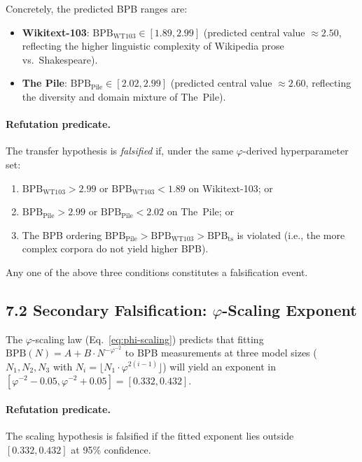 Concretely, the predicted BPB ranges are:
\begin{itemize}
  \item \textbf{Wikitext-103}:
    $\mathrm{BPB}_{\mathrm{WT103}} \in [1.89, 2.99]$
    (predicted central value $\approx 2.50$, reflecting the higher
    linguistic complexity of Wikipedia prose vs.\ Shakespeare).
  \item \textbf{The Pile}:
    $\mathrm{BPB}_{\mathrm{Pile}} \in [2.02, 2.99]$
    (predicted central value $\approx 2.60$, reflecting the
    diversity and domain mixture of The~Pile).
\end{itemize}

\paragraph{Refutation predicate.}
The transfer hypothesis is \emph{falsified} if, under the same
$\varphi$-derived hyperparameter set:
\begin{enumerate}
  \item $\mathrm{BPB}_{\mathrm{WT103}} > 2.99$ or
        $\mathrm{BPB}_{\mathrm{WT103}} < 1.89$ on Wikitext-103; or
  \item $\mathrm{BPB}_{\mathrm{Pile}} > 2.99$ or
        $\mathrm{BPB}_{\mathrm{Pile}} < 2.02$ on The~Pile; or
  \item The BPB ordering $\mathrm{BPB}_{\mathrm{Pile}} >
        \mathrm{BPB}_{\mathrm{WT103}} > \mathrm{BPB}_{\mathrm{ts}}$
        is violated (i.e., the more complex corpora do not yield higher BPB).
\end{enumerate}
Any one of the above three conditions constitutes a falsification
event.

\subsection{7.2 Secondary Falsification: $\varphi$-Scaling Exponent}
\label{subsec:ch25-falsify-scaling}

The $\varphi$-scaling law (Eq.~\ref{eq:phi-scaling}) predicts that
fitting $\mathrm{BPB}(N) = A + B \cdot N^{-\varphi^{-2}}$ to BPB
measurements at three model sizes ($N_1, N_2, N_3$ with
$N_i = \lfloor N_1 \cdot \varphi^{2(i-1)} \rfloor$) will yield
an exponent in $[\varphi^{-2} - 0.05, \varphi^{-2} + 0.05]
= [0.332, 0.432]$.

\paragraph{Refutation predicate.}
The scaling hypothesis is falsified if the fitted exponent lies
outside $[0.332, 0.432]$ at 95\% confidence.

